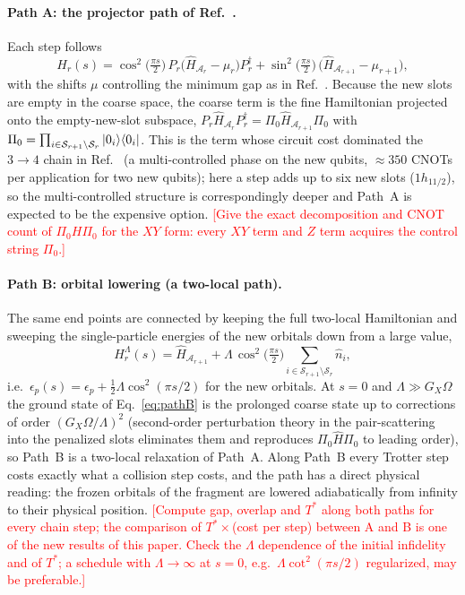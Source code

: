 \documentclass[
  aps,
  prc,
  reprint,
  superscriptaddress,
  floatfix,
  nofootinbib
]{revtex4-2}
\newcommand{\todo}[1]{\textcolor{red}{[#1]}}
\begin{document}
\paragraph{Path A: the projector path of Ref.~\cite{EigenQPairing2026}.}
Each step follows
\begin{equation}
  H_r(s)=\cos^2\!\big(\tfrac{\pi s}{2}\big)\,P_r\big(\hat H_{\mathcal A_r}-\mu_r\big)P_r^\dagger
        +\sin^2\!\big(\tfrac{\pi s}{2}\big)\,\big(\hat H_{\mathcal A_{r+1}}-\mu_{r+1}\big),
  \label{eq:pathA}
\end{equation}
with the shifts $\mu$ controlling the minimum gap as in
Ref.~\cite{EigenQPairing2026}.  Because the new slots are empty in the
coarse space, the coarse term is the fine Hamiltonian projected onto the
empty-new-slot subspace,
$P_r\hat H_{\mathcal A_r}P_r^\dagger=\Pi_0\hat H_{\mathcal A_{r+1}}\Pi_0$
with $\Pi_0=\prod_{i\in\mathcal S_{r+1}\setminus\mathcal S_r}\ket{0_i}\!\bra{0_i}$.
This is the term whose circuit cost dominated the $3\to4$ chain in
Ref.~\cite{EigenQPairing2026} (a multi-controlled phase on the new qubits,
$\approx350$ CNOTs per application for two new qubits); here a step adds up
to six new slots ($1h_{11/2}$), so the multi-controlled structure is
correspondingly deeper and Path~A is expected to be the expensive option.
\todo{Give the exact decomposition and CNOT count of $\Pi_0 H\Pi_0$ for the
$XY$ form: every $XY$ term and $Z$ term acquires the control string
$\Pi_0$.}

\paragraph{Path B: orbital lowering (a two-local path).}
The same end points are connected by keeping the full two-local Hamiltonian
and sweeping the single-particle energies of the new orbitals down from a
large value,
\begin{equation}
  H^{\Lambda}_r(s)=\hat H_{\mathcal A_{r+1}}
  +\Lambda\,\cos^2\!\big(\tfrac{\pi s}{2}\big)\sum_{i\in\mathcal S_{r+1}\setminus\mathcal S_r}\hat n_i ,
  \label{eq:pathB}
\end{equation}
i.e.\ $\epsilon_{p}(s)=\epsilon_p+\tfrac12\Lambda\cos^2(\pi s/2)$ for the new
orbitals.  At $s=0$ and $\Lambda\gg G_X\Omega$ the ground state of
Eq.~\eqref{eq:pathB} is the prolonged coarse state up to corrections of
order $(G_X\Omega/\Lambda)^2$ (second-order perturbation theory in the
pair-scattering into the penalized slots eliminates them and reproduces
$\Pi_0\hat H\Pi_0$ to leading order), so Path~B is a two-local relaxation
of Path~A.  Along Path~B every Trotter step costs exactly what a collision
step costs, and the path has a direct physical reading: the frozen orbitals
of the fragment are lowered adiabatically from infinity to their physical
position.  \todo{Compute gap, overlap and $T^*$ along both paths for every
chain step; the comparison of $T^*\times$(cost per step) between A and B is
one of the new results of this paper.  Check the $\Lambda$ dependence of
the initial infidelity and of $T^*$; a schedule with $\Lambda\to\infty$
at $s=0$, e.g.\ $\Lambda\cot^2(\pi s/2)$ regularized, may be preferable.}
\end{document}
